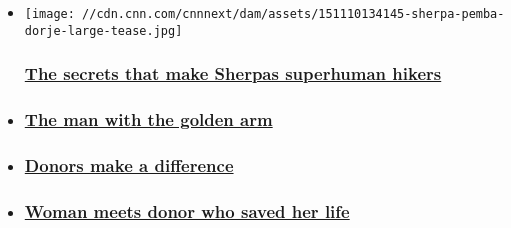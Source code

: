 \begin{itemize}
\item
  \href{/2015/11/11/health/sherpas-superhuman-mountaineers/index.html}{}

  \texttt{[image: //cdn.cnn.com/cnnnext/dam/assets/151110134145-sherpa-pemba-dorje-large-tease.jpg]}

  \hypertarget{the-secrets-that-make-sherpas-superhuman-hikers}{%
  \subsubsection{\texorpdfstring{\href{/2015/11/11/health/sherpas-superhuman-mountaineers/index.html}{The
  secrets that make Sherpas superhuman
  hikers}}{The secrets that make Sherpas superhuman hikers}}\label{the-secrets-that-make-sherpas-superhuman-hikers}}
\item
  \hypertarget{the-man-with-the-golden-arm}{%
  \subsubsection{\texorpdfstring{\href{/videos/health/2015/05/22/spc-vital-signs-miracle-blood-b.cnn}{The
  man with the golden
  arm}}{The man with the golden arm}}\label{the-man-with-the-golden-arm}}
\item
  \hypertarget{donors-make-a-difference}{%
  \subsubsection{\texorpdfstring{\href{/videos/health/2015/05/22/spc-vital-signs-miracle-blood-c.cnn}{Donors
  make a
  difference}}{Donors make a difference}}\label{donors-make-a-difference}}
\item
  \hypertarget{woman-meets-donor-who-saved-her-life}{%
  \subsubsection{\texorpdfstring{\href{/2015/06/16/health/cancer-stem-cell-donor-meeting/index.html}{Woman
  meets donor who saved her
  life}}{Woman meets donor who saved her life}}\label{woman-meets-donor-who-saved-her-life}}
\end{itemize}

